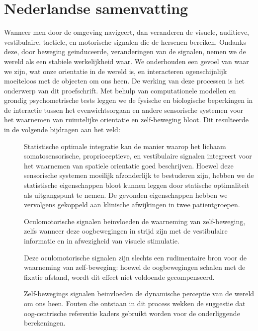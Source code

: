 \clearpage
\pagestyle{empty}

\chapter*{Nederlandse samenvatting}
{}

Wanneer men door de omgeving navigeert, dan veranderen de visuele, auditieve, vestibulaire, tactiele, en motorische signalen die de hersenen bereiken. Ondanks deze, door beweging geinduceerde, veranderingen van de signalen, nemen we de wereld als een stabiele werkelijkheid waar. We onderhouden een gevoel van waar we zijn, wat onze orientatie in de wereld is, en interacteren ogenschijnlijk moeiteloos met de objecten om ons heen. De werking van deze processen is het onderwerp van dit proefschrift. Met behulp van computationele modellen en grondig psychometrische tests leggen we de fysische en biologische beperkingen in de interactie tussen het evenwichtsorgaan en andere sensorische systemen voor het waarnemen van ruimtelijke orientatie en zelf-beweging bloot. Dit resulteerde in de volgende bijdragen aan het veld:

\begin{description}
\item[] Statistische optimale integratie kan de manier waarop het lichaam somatosensorische, proprioceptieve, en vestibulaire signalen integreert voor het waarnemen van spatiele orientatie goed beschrijven. Hoewel deze sensorische systemen moeilijk afzonderlijk te bestuderen zijn, hebben we de statistische eigenschappen bloot kunnen leggen door statische optimaliteit als uitgangspunt te nemen. De gevonden eigenschappen hebben we vervolgens gekoppeld aan klinische afwijkingen in twee patientgroepen.
\item[] Oculomotorische signalen beinvloeden de waarneming van zelf-beweging, zelfs wanneer deze oogbewegingen in strijd zijn met de vestibulaire informatie en in afwezigheid van visuele stimulatie.
\item[] Deze oculomotorische signalen zijn slechts een rudimentaire bron voor de waarneming van zelf-beweging: hoewel de oogbewegingen schalen met de fixatie afstand, wordt dit effect niet voldoende gecompenseerd.
\item[] Zelf-bewegings signalen beinvloeden de dynamische perceptie van de wereld om ons heen. Fouten die ontstaan in dit process wekken de suggestie dat oog-centrische referentie kaders gebruikt worden voor de onderliggende berekeningen.
\end{description}

